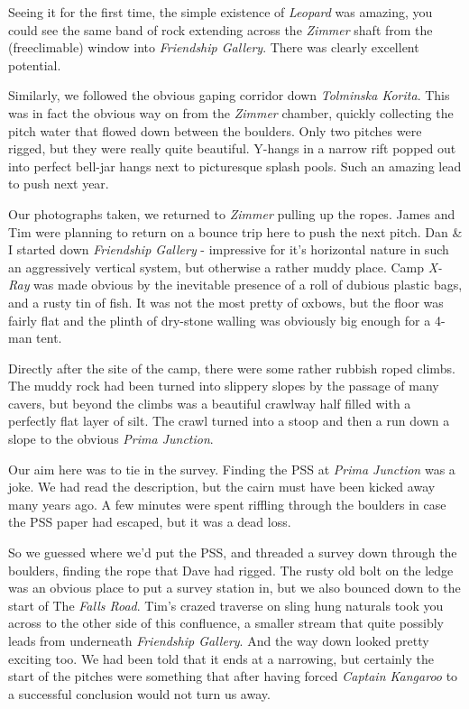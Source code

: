 Seeing it for the first time, the simple existence of \emph{Leopard} was
amazing, you could see the same band of rock extending across the
\emph{Zimmer} shaft from the (freeclimable) window into \emph{Friendship
Gallery}. There was clearly excellent potential.

Similarly, we followed the obvious gaping corridor down \emph{Tolminska
Korita}. This was in fact the obvious way on from the \emph{Zimmer}
chamber, quickly collecting the pitch water that flowed down between the
boulders. Only two pitches were rigged, but they were really quite
beautiful. Y-hangs in a narrow rift popped out into perfect bell-jar
hangs next to picturesque splash pools. Such an amazing lead to push
next year.

Our photographs taken, we returned to \emph{Zimmer} pulling up the
ropes. James and Tim were planning to return on a bounce trip here to
push the next pitch. Dan \& I started down \emph{Friendship Gallery} -
impressive for it's horizontal nature in such an aggressively vertical
system, but otherwise a rather muddy place. Camp \emph{X-Ray} was made
obvious by the inevitable presence of a roll of dubious plastic bags,
and a rusty tin of fish. It was not the most pretty of oxbows, but the
floor was fairly flat and the plinth of dry-stone walling was obviously
big enough for a 4-man tent.

Directly after the site of the camp, there were some rather rubbish
roped climbs. The muddy rock had been turned into slippery slopes by the
passage of many cavers, but beyond the climbs was a beautiful crawlway
half filled with a perfectly flat layer of silt. The crawl turned into a
stoop and then a run down a slope to the obvious \emph{Prima Junction}.

Our aim here was to tie in the survey. Finding the PSS at \emph{Prima
Junction} was a joke. We had read the description, but the cairn must
have been kicked away many years ago. A few minutes were spent riffling
through the boulders in case the PSS paper had escaped, but it was a
dead loss.

So we guessed where we'd put the PSS, and threaded a survey down through
the boulders, finding the rope that Dave had rigged. The rusty old bolt
on the ledge was an obvious place to put a survey station in, but we
also bounced down to the start of The \emph{Falls Road}. Tim's crazed
traverse on sling hung naturals took you across to the other side of
this confluence, a smaller stream that quite possibly leads from
underneath \emph{Friendship Gallery}. And the way down looked pretty
exciting too. We had been told that it ends at a narrowing, but
certainly the start of the pitches were something that after having
forced \emph{Captain Kangaroo} to a successful conclusion would not turn
us away.


